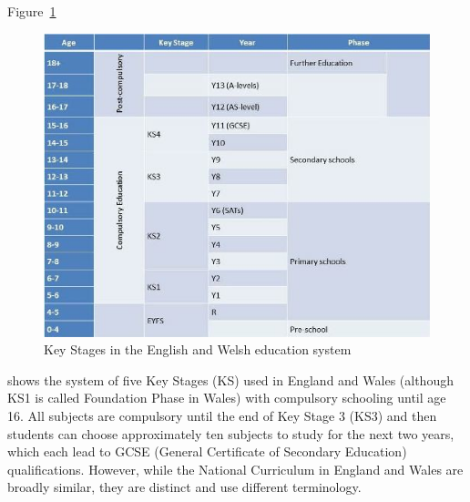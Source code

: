 \documentclass{sig-alternate}
\begin{document}
Figure~\ref{fig:key-stages}
\begin{figure}
  \centering
  \includegraphics[width=\columnwidth]{images/keystages.png}
  \caption{Key Stages in the English and Welsh education system}
  \label{fig:key-stages}
\end{figure}
shows the system of five Key Stages (KS)
used in England and Wales (although KS1 is called Foundation Phase in
Wales) with compulsory schooling until age 16. All subjects are
compulsory until the end of Key Stage 3 (KS3) and then students can
choose approximately ten subjects to study for the next two years,
which each lead to GCSE (General Certificate of Secondary Education)
qualifications. However, while the National Curriculum in England and
Wales are broadly similar, they are distinct and use different
terminology.
\end{document}

